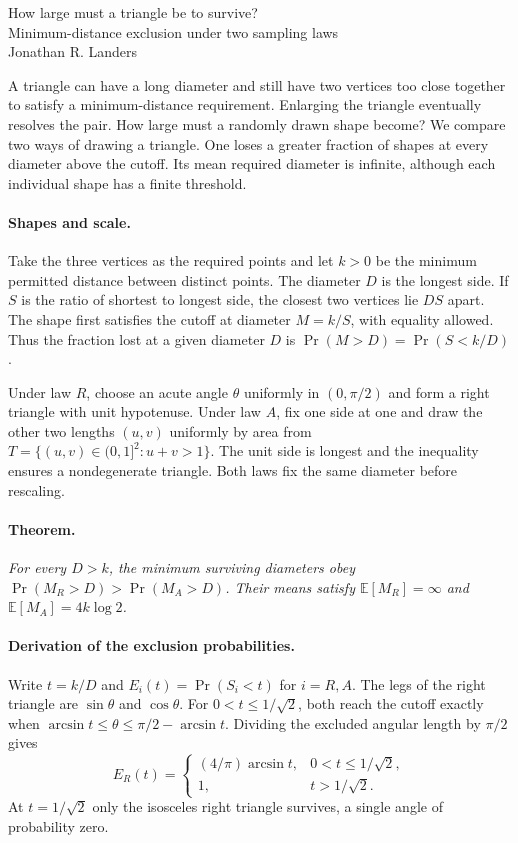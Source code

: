 \documentclass[11pt]{article}
\begin{document}
\begin{center}
{\LARGE How large must a triangle be to survive?}\\[6pt]
{\large Minimum-distance exclusion under two sampling laws}\\[6pt]
Jonathan R. Landers
\end{center}

A triangle can have a long diameter and still have two vertices too close
together to satisfy a minimum-distance requirement. Enlarging the triangle
eventually resolves the pair. How large must a randomly drawn shape become?
We compare two ways of drawing a triangle. One loses a greater fraction of
shapes at every diameter above the cutoff. Its mean required diameter is
infinite, although each individual shape has a finite threshold.

\paragraph{Shapes and scale.}
Take the three vertices as the required points and let $k>0$ be the minimum
permitted distance between distinct points. The diameter $D$ is the longest
side. If $S$ is the ratio of shortest to longest side, the closest two
vertices lie $DS$ apart. The shape first satisfies the cutoff at diameter
$M=k/S$, with equality allowed. Thus the fraction lost at a given diameter
$D$ is $\Pr(M>D)=\Pr(S<k/D)$.

Under law $R$, choose an acute angle $\theta$ uniformly in $(0,\pi/2)$ and
form a right triangle with unit hypotenuse. Under law $A$, fix one side at one
and draw the other two lengths $(u,v)$ uniformly by area from
$T=\{(u,v)\in(0,1]^2:u+v>1\}$. The unit side is longest and the inequality
ensures a nondegenerate triangle. Both laws fix the same diameter before
rescaling.

\paragraph{Theorem.}
\textit{For every $D>k$, the minimum surviving diameters obey
$\Pr(M_R>D)>\Pr(M_A>D)$. Their means satisfy
$\mathbb E[M_R]=\infty$ and $\mathbb E[M_A]=4k\log 2$.}

\paragraph{Derivation of the exclusion probabilities.}
Write $t=k/D$ and $E_i(t)=\Pr(S_i<t)$ for $i=R,A$. The legs of the right
triangle are $\sin\theta$ and $\cos\theta$. For $0<t\le1/\sqrt2$, both reach
the cutoff exactly when $\arcsin t\le\theta\le\pi/2-\arcsin t$.
Dividing the excluded angular length by $\pi/2$ gives
\[
 E_R(t)=
 \begin{cases}
 (4/\pi)\arcsin t,&0<t\le1/\sqrt2,\\
 1,&t>1/\sqrt2 .
 \end{cases}
\]
At $t=1/\sqrt2$ only the isosceles right triangle survives, a single angle of
probability zero.
\end{document}
